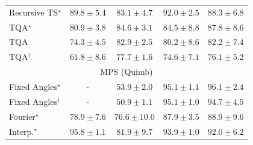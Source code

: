 \begin{tabular}{l|cccc|}
Recursive TS$^\star$ & {\cellcolor[HTML]{821781}} \color[HTML]{F1F1F1} $89.8\pm 5.4$ & {\cellcolor[HTML]{8950A4}} \color[HTML]{F1F1F1} $83.1\pm 4.7$ & {\cellcolor[HTML]{760C71}} \color[HTML]{F1F1F1} $92.0\pm 2.5$ & {\cellcolor[HTML]{84258B}} \color[HTML]{F1F1F1} $88.3\pm 6.8$ \\
TQA$^\star$ & {\cellcolor[HTML]{8B60AC}} \color[HTML]{F1F1F1} $80.9\pm 3.8$ & {\cellcolor[HTML]{88449E}} \color[HTML]{F1F1F1} $84.6\pm 3.1$ & {\cellcolor[HTML]{88459F}} \color[HTML]{F1F1F1} $84.5\pm 8.8$ & {\cellcolor[HTML]{85288D}} \color[HTML]{F1F1F1} $87.8\pm 8.6$ \\
TQA & {\cellcolor[HTML]{8C91C4}} \color[HTML]{F1F1F1} $74.3\pm 4.5$ & {\cellcolor[HTML]{8A51A5}} \color[HTML]{F1F1F1} $82.9\pm 2.5$ & {\cellcolor[HTML]{8B65AE}} \color[HTML]{F1F1F1} $80.2\pm 8.6$ & {\cellcolor[HTML]{8A56A7}} \color[HTML]{F1F1F1} $82.2\pm 7.4$ \\
TQA$^\dagger$ & {\cellcolor[HTML]{C2D5E7}} \color[HTML]{000000} $61.8\pm 8.6$ & {\cellcolor[HTML]{8C78B7}} \color[HTML]{F1F1F1} $77.7\pm 1.6$ & {\cellcolor[HTML]{8C8FC2}} \color[HTML]{F1F1F1} $74.6\pm 7.1$ & {\cellcolor[HTML]{8C84BD}} \color[HTML]{F1F1F1} $76.1\pm 5.2$ \\
\cline{1-5}
\multicolumn{5}{c}{\rule{0pt}{8pt}MPS (Quimb)} \\
\midrule
Fixed Angles$^\star$ & {\cellcolor[HTML]{000000}} \color[HTML]{F1F1F1} {\cellcolor{white}} \color{black} - & {\cellcolor[HTML]{FFFBD0}} \color[HTML]{000000} $53.9\pm 2.0$ & {\cellcolor[HTML]{712806}} \color[HTML]{F1F1F1} $95.1\pm 1.1$ & {\cellcolor[HTML]{692606}} \color[HTML]{F1F1F1} $96.1\pm 2.4$ \\
Fixed Angles$^\dagger$ & {\cellcolor[HTML]{000000}} \color[HTML]{F1F1F1} {\cellcolor{white}} \color{black} - & {\cellcolor[HTML]{FFFFE5}} \color[HTML]{000000} $50.9\pm 1.1$ & {\cellcolor[HTML]{712806}} \color[HTML]{F1F1F1} $95.1\pm 1.0$ & {\cellcolor[HTML]{762A05}} \color[HTML]{F1F1F1} $94.7\pm 4.5$ \\
Fourier$^\star$ & {\cellcolor[HTML]{ED7316}} \color[HTML]{F1F1F1} $78.9\pm 7.6$ & {\cellcolor[HTML]{F5841E}} \color[HTML]{F1F1F1} $76.6\pm 10.0$ & {\cellcolor[HTML]{B34003}} \color[HTML]{F1F1F1} $87.9\pm 3.5$ & {\cellcolor[HTML]{A93C03}} \color[HTML]{F1F1F1} $88.9\pm 9.6$ \\
Interp.$^\star$ & {\cellcolor[HTML]{6B2606}} \color[HTML]{F1F1F1} $95.8\pm 1.1$ & {\cellcolor[HTML]{DD5F0C}} \color[HTML]{F1F1F1} $81.9\pm 9.7$ & {\cellcolor[HTML]{7C2C05}} \color[HTML]{F1F1F1} $93.9\pm 1.0$ & {\cellcolor[HTML]{8E3104}} \color[HTML]{F1F1F1} $92.0\pm 6.2$ \\

\end{tabular}
